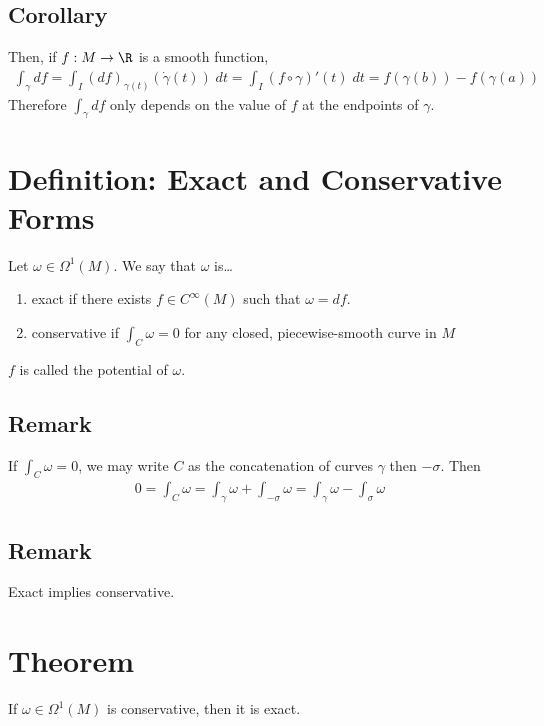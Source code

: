 \documentclass[11pt]{article}
\begin{document}
\subsection*{Corollary}
\label{sec:org068faf5}
Then, if \(f:M\to\R\) is a smooth function,\\
\begin{align*}
  \int_{\gamma}df
  =\int_{I}(df)_{\gamma(t)}(\dot{\gamma}(t))\;dt
  =\int_{I}(f\circ\gamma)'(t)\;dt
  =f(\gamma(b))-f(\gamma(a))
\end{align*}
Therefore \(\int_{\gamma}df\) only depends on the value of \(f\) at the endpoints of \(\gamma\).\\
\section*{Definition: Exact and Conservative Forms}
\label{sec:orgd63e882}
Let \(\omega\in\Omega^{1}(M)\). We say that \(\omega\) is\ldots{}\\
\begin{enumerate}
\item exact if there exists \(f\in C^{\infty}(M)\) such that \(\omega=df\).\\
\item conservative if \(\int_{C}\omega=0\) for any closed, piecewise-smooth curve in \(M\)\\
\end{enumerate}
\(f\) is called the potential of \(\omega\).\\
\subsection*{Remark}
\label{sec:orgcda0827}
If \(\int_{C}\omega=0\), we may write \(C\) as the concatenation of curves \(\gamma\) then \(-\sigma\). Then\\
\begin{align*}
  0
  =\int_{C}\omega
  =\int_{\gamma}\omega+\int_{-\sigma}\omega
  =\int_{\gamma}\omega-\int_{\sigma}\omega
\end{align*}
\subsection*{Remark}
\label{sec:orgc28dbc2}
Exact implies conservative.\\
\section*{Theorem}
\label{sec:org46cffa6}
If \(\omega\in\Omega^{1}(M)\) is conservative, then it is exact.\\
\end{document}
